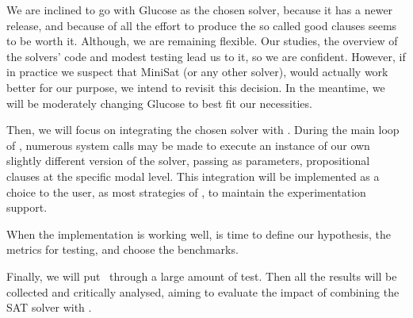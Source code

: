 We are inclined to go with Glucose as the chosen solver, because it has a newer
release, and because of all the effort to produce the so called good clauses
seems to be worth it. Although, we are remaining flexible. Our studies, the
overview of the solvers' code and modest testing lead us to it, so we are
confident. However, if in practice we suspect that MiniSat (or any other
solver), would actually work better for our purpose, we intend to revisit this
decision. In the meantime, we will be moderately changing Glucose to best fit
our necessities.

Then, we will focus on integrating the chosen solver with \ksp. During the main
loop of \ksp, numerous system calls may be made to execute an instance of our
own slightly different version of the solver, passing as parameters,
propositional clauses at the specific modal level. This integration will be
implemented as a choice to the user, as most strategies of \ksp, to maintain the
experimentation support.

When the implementation is working well, is time to define our hypothesis, the
metrics for testing, and choose the benchmarks.

Finally, we will put \ksp~through a large amount of test. Then all the results
will be collected and critically analysed, aiming to evaluate the impact of
combining the SAT solver with \ksp.

